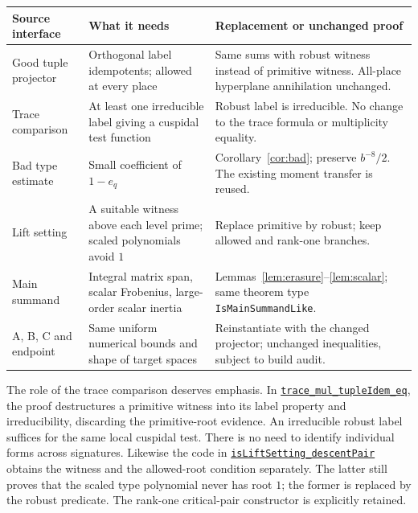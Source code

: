 \documentclass[11pt]{article}
\theoremstyle{definition}\newtheorem{definition}[theorem]{Definition}
\newcommand{\src}[2]{\href{https://github.com/VladimirReshetnikov/ProveIt/blob/ee10f937fedac0955d28b7b860f4c44fab508204/Analysis/GeneralizedRiemannHypothesis/Lean/grh/src/#1}{\texttt{#2}}}
\begin{document}
\begin{center}
\renewcommand{\arraystretch}{1.19}
\begin{tabular}{@{}>{\raggedright\arraybackslash}p{.28\linewidth}>{\raggedright\arraybackslash}p{.30\linewidth}>{\raggedright\arraybackslash}p{.34\linewidth}@{}}
\toprule
Source interface & What it needs & Replacement or unchanged proof \\
\midrule
Good tuple projector & Orthogonal label idempotents; allowed at every place & Same sums with robust witness instead of primitive witness. All-place hyperplane annihilation unchanged. \\
Trace comparison & At least one irreducible label giving a cuspidal test function & Robust label is irreducible. No change to the trace formula or multiplicity equality. \\
Bad type estimate & Small coefficient of $1-e_q$ & Corollary~\ref{cor:bad}; preserve $b^{-8}/2$. The existing moment transfer is reused. \\
Lift setting & A suitable witness above each level prime; scaled polynomials avoid $1$ & Replace primitive by robust; keep allowed and rank-one branches. \\
Main summand & Integral matrix span, scalar Frobenius, large-order scalar inertia & Lemmas~\ref{lem:erasure}--\ref{lem:scalar}; same theorem type \texttt{IsMainSummandLike}. \\
A, B, C and endpoint & Same uniform numerical bounds and shape of target spaces & Reinstantiate with the changed projector; unchanged inequalities, subject to build audit. \\
\bottomrule
\end{tabular}
\end{center}

The role of the trace comparison deserves emphasis. In \src{New/Spanning/Multiplicities/EqualMultiplicities.lean\#L249}{trace\_mul\_tupleIdem\_eq}, the proof destructures a primitive witness into its label property and irreducibility, discarding the primitive-root evidence. An irreducible robust label suffices for the same local cuspidal test. There is no need to identify individual forms across signatures. Likewise the code in \src{New/Congruences/GaloisRepresentations/AttachedRepresentations.lean\#L81}{isLiftSetting\_descentPair} obtains the witness and the allowed-root condition separately. The latter still proves that the scaled type polynomial never has root $1$; the former is replaced by the robust predicate. The rank-one critical-pair constructor is explicitly retained.
\end{document}
